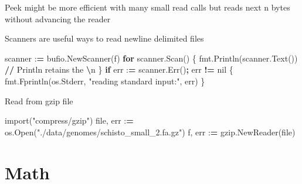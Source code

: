 \documentclass[]{book}
\newenvironment{Shaded}{\begin{snugshade}}{\end{snugshade}}
\newcommand{\DecValTok}[1]{\textcolor[rgb]{0.00,0.00,0.81}{#1}}
\newcommand{\CharTok}[1]{\textcolor[rgb]{0.31,0.60,0.02}{#1}}
\newcommand{\SpecialCharTok}[1]{\textcolor[rgb]{0.00,0.00,0.00}{#1}}
\newcommand{\StringTok}[1]{\textcolor[rgb]{0.31,0.60,0.02}{#1}}
\newcommand{\ImportTok}[1]{#1}
\newcommand{\ControlFlowTok}[1]{\textcolor[rgb]{0.13,0.29,0.53}{\textbf{#1}}}
\newcommand{\OperatorTok}[1]{\textcolor[rgb]{0.81,0.36,0.00}{\textbf{#1}}}
\newcommand{\BuiltInTok}[1]{#1}
\newcommand{\NormalTok}[1]{#1}
\begin{document}
Peek might be more efficient with many small read calls but reads next n
bytes without advancing the reader

\begin{Shaded}
\end{Shaded}

Scanners are useful ways to read newline delimited files

\begin{Shaded}
\begin{Highlighting}[]
\NormalTok{scanner :}\OperatorTok{=}\NormalTok{ bufio.NewScanner(f)                             }
\ControlFlowTok{for}\NormalTok{ scanner.Scan() \{                                       }
\NormalTok{    fmt.Println(scanner.Text()) }\OperatorTok{//}\NormalTok{ Println retains the }\OperatorTok{\textbackslash{}}\NormalTok{n  }
\NormalTok{\}                                                          }
\ControlFlowTok{if}\NormalTok{ err :}\OperatorTok{=}\NormalTok{ scanner.Err()}\OperatorTok{;}\NormalTok{ err }\OperatorTok{!=}\NormalTok{ nil \{                      }
\NormalTok{    fmt.Fprintln(os.Stderr, }\StringTok{"reading standard input:"}\NormalTok{, err)}
\NormalTok{\}}
\end{Highlighting}
\end{Shaded}

Read from gzip file

\begin{Shaded}
\begin{Highlighting}[]
\ImportTok{import}\NormalTok{(}\StringTok{"compress/gzip"}\NormalTok{)                                                          }
\BuiltInTok{file}\NormalTok{, err :}\OperatorTok{=}\NormalTok{ os.Open(}\StringTok{"./data/genomes/schisto_small_2.fa.gz"}\NormalTok{)}
\NormalTok{f, err :}\OperatorTok{=}\NormalTok{ gzip.NewReader(}\BuiltInTok{file}\NormalTok{)}
\end{Highlighting}
\end{Shaded}

\section{Math}\label{math}
\end{document}
